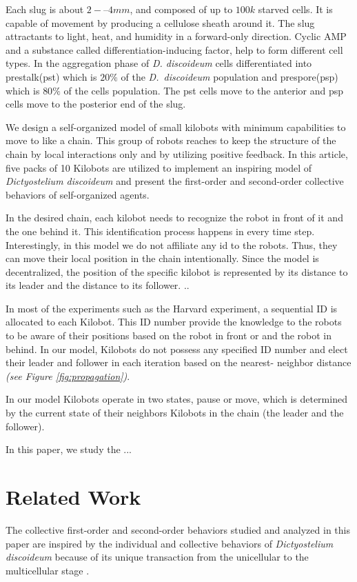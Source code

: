 \documentclass[11pt,a4paper]{article}
\begin{document}
Each slug is about $2-–4 mm$, and composed of up to $100k$ starved cells. It is capable of movement by producing a cellulose sheath around it. The slug attractants to light, heat, and humidity in a forward-only direction. Cyclic AMP and a substance called differentiation-inducing factor, help to form different cell types. In the aggregation phase of \textit{D. discoideum} cells differentiated into prestalk(pst) which is $20\%$ of the \textit{D.~discoideum} population and prespore(psp) which is $80\%$ of the cells population. The pst cells move to the anterior and psp cells move to the posterior end of the slug.

We design a self-organized model of small kilobots with minimum capabilities to move to like a chain. This group of robots reaches to keep the structure of the chain by local interactions only and by utilizing positive feedback.   In this article, five packs of 10 Kilobots are utilized to implement an inspiring model of \textit{Dictyostelium discoideum} and present the first-order and second-order collective behaviors of self-organized agents.  

In the desired chain, each kilobot needs to recognize the robot in front of it and the one behind it. This identification process happens in every time step. Interestingly, in this model we do not affiliate any id to the robots. Thus, they can move their local position in the chain intentionally. Since the model is decentralized, the position of the specific kilobot is represented by its distance to its leader and the distance to its follower. ..

In most of the experiments such as the Harvard experiment, a sequential ID  is allocated to each Kilobot. This ID number provide the knowledge to the robots to be aware of their positions based on the robot in front or and the robot in behind. In our model, Kilobots do not possess any specified ID number and elect their leader and follower in each iteration based on the nearest- neighbor distance \textit{(see Figure \ref{fig:propagation})}. 


In our model Kilobots operate in two states, pause or move, which is determined by the current state of their neighbors Kilobots in the chain (the leader and the follower). 

In this paper, we study the ...
\section{Related Work} 
The collective first-order and second-order behaviors studied and analyzed in this paper are inspired by the individual and collective behaviors of \textit{Dictyostelium discoideum} because of its unique transaction from the unicellular to the multicellular stage \cite{loomis2012dictyostelium, maeda2005regulation}. 
\end{document}
